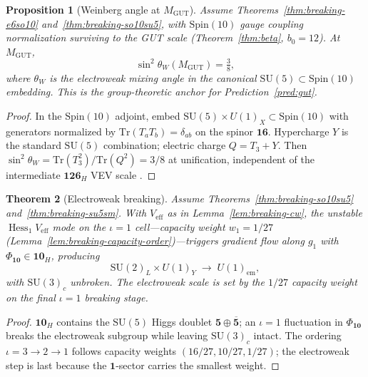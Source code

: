 \documentclass[aps,prd,onecolumn,amsmath,amssymb,nofootinbib,11pt]{revtex4-2}
\numberwithin{equation}{section}
\theoremstyle{plain}
\newtheorem{theorem}{Theorem}[section]
\newtheorem{proposition}[theorem]{Proposition}
\theoremstyle{definition}
\theoremstyle{remark}
\newcommand{\Spin}{\mathrm{Spin}}
\newcommand{\Hess}{\operatorname{Hess}}
\begin{document}
\begin{proposition}[Weinberg angle at $M_{\mathrm{GUT}}$]
\label{prop:weinberg-gut}
Assume Theorems~\ref{thm:breaking-e6so10} and~\ref{thm:breaking-so10su5}, with
$\Spin(10)$ gauge coupling normalization surviving to the GUT scale
(Theorem~\ref{thm:beta}, $b_0=12$). At $M_{\mathrm{GUT}}$,
\begin{equation}\label{eq:weinberg-gut}
  \sin^2\theta_W(M_{\mathrm{GUT}})=\tfrac38,
\end{equation}
where $\theta_W$ is the electroweak mixing angle in the canonical
$\mathrm{SU}(5)\subset\Spin(10)$ embedding. This is the group-theoretic anchor
for Prediction~\ref{pred:gut}.
\end{proposition}

\begin{proof}
In the $\Spin(10)$ adjoint, embed
$\mathrm{SU}(5)\times U(1)_X\subset\Spin(10)$ with generators normalized by
$\mathrm{Tr}(T_aT_b)=\delta_{ab}$ on the spinor $\mathbf{16}$. Hypercharge
$Y$ is the standard $\mathrm{SU}(5)$ combination; electric charge
$Q=T_3+Y$. Then
$\sin^2\theta_W=\mathrm{Tr}(T_3^2)/\mathrm{Tr}(Q^2)=3/8$ at unification,
independent of the intermediate $\mathbf{126}_H$ VEV scale
\cite{GeorgiGlashow1974,Witten1985}.
\end{proof}

\begin{theorem}[Electroweak breaking]\label{thm:breaking-ew}
Assume Theorems~\ref{thm:breaking-so10su5} and~\ref{thm:breaking-su5sm}.
With $V_{\mathrm{eff}}$ as in Lemma~\ref{lem:breaking-cw}, the unstable
$\Hess_1 V_{\mathrm{eff}}$ mode on the $\iota=1$ cell---capacity weight
$w_1=1/27$ (Lemma~\ref{lem:breaking-capacity-order})---triggers gradient flow
along $g_1$ with $\Phi_{\mathbf{10}}\in\mathbf{10}_H$, producing
\begin{equation}\label{eq:breaking-ew}
  \mathrm{SU}(2)_L\times U(1)_Y
  \;\longrightarrow\;
  U(1)_{\mathrm{em}},
\end{equation}
with $\mathrm{SU}(3)_c$ unbroken. The electroweak scale is set by the
$1/27$ capacity weight on the final $\iota=1$ breaking stage.
\end{theorem}

\begin{proof}
$\mathbf{10}_H$ contains the $\mathrm{SU}(5)$ Higgs doublet
$\mathbf{5}\oplus\overline{\mathbf{5}}$; an $\iota=1$ fluctuation in
$\Phi_{\mathbf{10}}$ breaks the electroweak subgroup while leaving
$\mathrm{SU}(3)_c$ intact. The ordering $\iota=3\to2\to1$ follows capacity
weights $(16/27,10/27,1/27)$; the electroweak step is last because the
$\mathbf{1}$-sector carries the smallest weight.
\end{proof}
\end{document}
